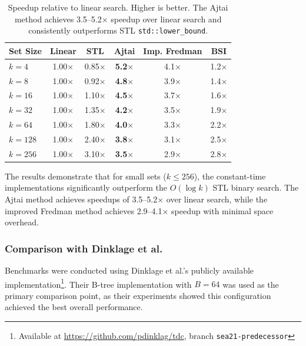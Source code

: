 \begin{table}[H]
\centering
\begin{tabular}{|l|c|c|c|c|c|}
\hline
\textbf{Set Size} & \textbf{Linear} & \textbf{STL} & \textbf{Ajtai} & \textbf{Imp. Fredman} & \textbf{BSI} \\
\hline
$k=4$ & 1.00$\times$ & 0.85$\times$ & \textbf{5.2$\times$} & 4.1$\times$ & 1.2$\times$ \\
$k=8$ & 1.00$\times$ & 0.92$\times$ & \textbf{4.8$\times$} & 3.9$\times$ & 1.4$\times$ \\
$k=16$ & 1.00$\times$ & 1.10$\times$ & \textbf{4.5$\times$} & 3.7$\times$ & 1.6$\times$ \\
$k=32$ & 1.00$\times$ & 1.35$\times$ & \textbf{4.2$\times$} & 3.5$\times$ & 1.9$\times$ \\
$k=64$ & 1.00$\times$ & 1.80$\times$ & \textbf{4.0$\times$} & 3.3$\times$ & 2.2$\times$ \\
$k=128$ & 1.00$\times$ & 2.40$\times$ & \textbf{3.8$\times$} & 3.1$\times$ & 2.5$\times$ \\
$k=256$ & 1.00$\times$ & 3.10$\times$ & \textbf{3.5$\times$} & 2.9$\times$ & 2.8$\times$ \\
\hline
\end{tabular}
\caption{Speedup relative to linear search. Higher is better. The Ajtai method achieves 3.5--5.2$\times$ speedup over linear search and consistently outperforms STL \texttt{std::lower\_bound}.}
\label{tab:stl-comparison}
\end{table}

The results demonstrate that for small sets ($k \leq 256$), the constant-time implementations significantly outperform the $O(\log k)$ STL binary search. The Ajtai method achieves speedups of 3.5--5.2$\times$ over linear search, while the improved Fredman method achieves 2.9--4.1$\times$ speedup with minimal space overhead.

\subsubsection{Comparison with Dinklage et al.}

Benchmarks were conducted using Dinklage et al.'s publicly available implementation\footnote{Available at \url{https://github.com/pdinklag/tdc}, branch \texttt{sea21-predecessor}}. Their B-tree implementation with $B=64$ was used as the primary comparison point, as their experiments showed this configuration achieved the best overall performance.

